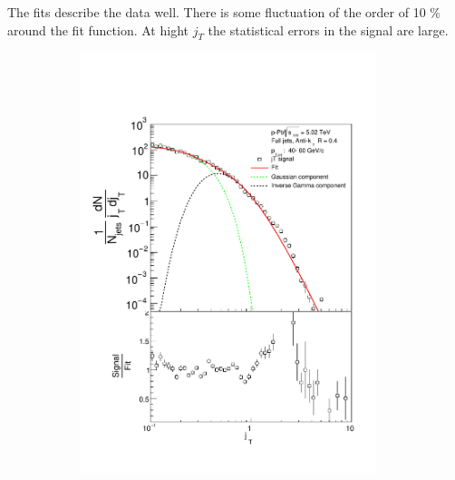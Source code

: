 The fits describe the data well. There is some fluctuation of the order of 10 \% around the fit function. At hight $j_T$ the statistical errors in the signal are large.

\begin{figure}
\centering
\begin{subfigure}{0.24\textwidth}
\includegraphics[width=0.95\textwidth]{results/JetConejTSignalFit/JetConejTSignalFitNFin00JetPt04perconeBgBayes}

\end{subfigure}
\end{figure}
